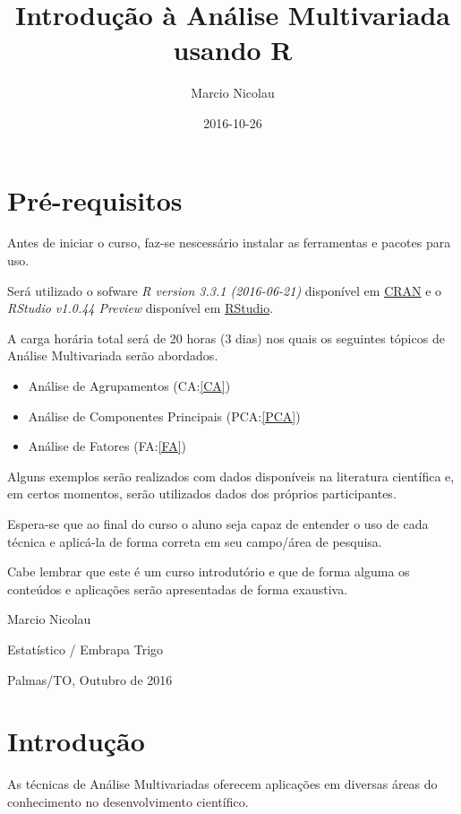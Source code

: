 \documentclass[]{book}
\title{Introdução à Análise Multivariada usando R}
\author{Marcio Nicolau}
\date{2016-10-26}
\providecommand{\tightlist}{%
  \setlength{\itemsep}{0pt}\setlength{\parskip}{0pt}}
\begin{document}
\maketitle

{
\setcounter{tocdepth}{1}
\tableofcontents
}
\chapter{Pré-requisitos}\label{pre-requisitos}

Antes de iniciar o curso, faz-se nescessário instalar as ferramentas e
pacotes para uso.

Será utilizado o sofware \emph{R version 3.3.1 (2016-06-21)} disponível
em \href{https://cran.r-project.org}{CRAN} e o \emph{RStudio v1.0.44
Preview} disponível em
\href{https://www.rstudio.com/products/rstudio/download/preview/}{RStudio}.

A carga horária total será de 20 horas (3 dias) nos quais os seguintes
tópicos de Análise Multivariada serão abordados.

\begin{itemize}
\tightlist
\item
  Análise de Agrupamentos (CA:\ref{CA})
\item
  Análise de Componentes Principais (PCA:\ref{PCA})
\item
  Análise de Fatores (FA:\ref{FA})
\end{itemize}

Alguns exemplos serão realizados com dados disponíveis na literatura
científica e, em certos momentos, serão utilizados dados dos próprios
participantes.

Espera-se que ao final do curso o aluno seja capaz de entender o uso de
cada técnica e aplicá-la de forma correta em seu campo/área de pesquisa.

Cabe lembrar que este é um curso introdutório e que de forma alguma os
conteúdos e aplicações serão apresentadas de forma exaustiva.

Marcio Nicolau

Estatístico / Embrapa Trigo

Palmas/TO, Outubro de 2016

\chapter{Introdução}\label{intro}

As técnicas de Análise Multivariadas oferecem aplicações em diversas
áreas do conhecimento no desenvolvimento científico.
\end{document}
